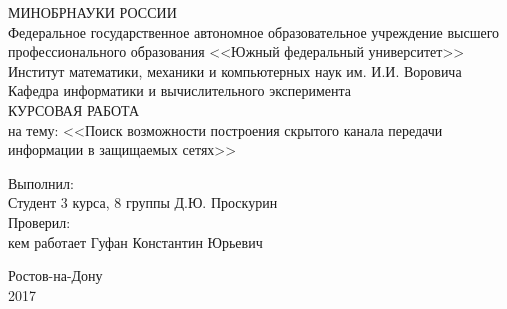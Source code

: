 \documentclass[fleqn,12pt, a4paper]{report}
\newcommand {\eps} {\varepsilon}
\begin{document}

\begin{titlepage}

\begin{center} 
\MakeUppercase{Минобрнауки России}\\
Федеральное государственное автономное образовательное учреждение
высшего профессионального образования
<<Южный федеральный университет>>\\[1 cm]

Институт математики, механики и компьютерных наук им. И.И. Воровича\\[1 cm]

Кафедра информатики и вычислительного эксперимента\\[5cm]

\Huge \MakeUppercase{Курсовая работа} \\[0.6cm]

\large на тему: <<Поиск возможности построения скрытого канала передачи информации в защищаемых сетях>>\\[7cm]

\end{center}

\begin{flushleft}
{\large 
Выполнил: \\
Студент 3 курса, 8 группы \hfill Д.Ю. Проскурин \\[1cm]

Проверил:\\
кем работает \hfill Гуфан Константин Юрьевич}

\end{flushleft}
\vfill

\begin{center}
Ростов-на-Дону\\
2017
\end{center}
\end{titlepage}


\end{document}

